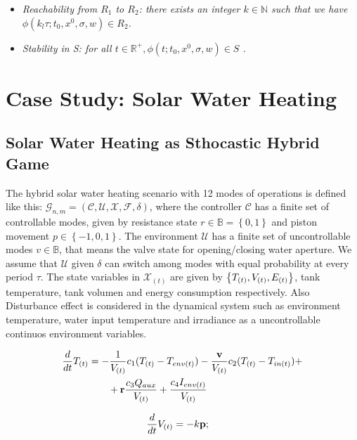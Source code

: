 \documentclass[conference]{IEEEtran}
\begin{document}
\begin{itemize}
  \item  \emph{Reachability from ${R_1}$ to ${R_2}$: there exists 
  an integer ${k \in \mathbb{N} }$ such that we have ${ \phi( k_l\tau
  ;t_0,x^0,\sigma,w) \in R_2 }$.}
  
  \item \emph{ Stability in S: for all ${ t \in \mathbb{R}^+, 
  \phi(t;t_0,x^0,\sigma,w) \in S}$ .}
\end{itemize}


\section{Case Study: Solar Water Heating}


\subsection{Solar Water Heating as Sthocastic Hybrid Game}

The hybrid solar water heating scenario with 12 modes of operations is
defined  like this: $\mathcal{G}_{n,m} = (\mathcal{C,U,X,F},\delta)$, 
where the controller $\mathcal{C}$ has a finite set of controllable modes,
given by resistance state ${r \in \mathbb{B} = \left\lbrace 0,1 \right\rbrace }$ 
and piston movement $p \in \left\lbrace-1,0,1\right\rbrace $. 
The environment $\mathcal{U}$ has a finite set of uncontrollable modes
 $v \in \mathbb{B} $, that means the valve state for opening/closing
water aperture. We assume that $\mathcal{U}$ given $\delta$ can switch
among modes with equal probability at every period $\tau$. The state variables
in $\mathcal{X}_{(t)}$ are given by $\left\lbrace T_{(t)},V_{(t)},E_{(t)} \right\rbrace $, 
tank temperature, tank volumen and energy consumption respectively. Also 
Disturbance effect is considered in the dynamical system such as environment
temperature, water input temperature and irradiance as a uncontrollable 
continuos environment variables.


\begin{align}
    \frac{d}{dt}\tcont &=   -\frac{1}{\vcont}  \constone(\tcont-\tenv) - 
    \frac{ \textbf{v} }{\vcont}\consttwo (\tcont-\tin) + \notag\\ &\qquad +
    \textbf{r} \frac{ \constthree \auxheat  }{\vcont}  + 
    \frac{ \constfour \irradiance}{\vcont} 
\label{temperature-equation}
\end{align}

\begin{equation}
    \frac{d}{dt}\vcont = -k \textbf{p}; \quad
\label{volume-equation}
\end{equation}
\end{document}

